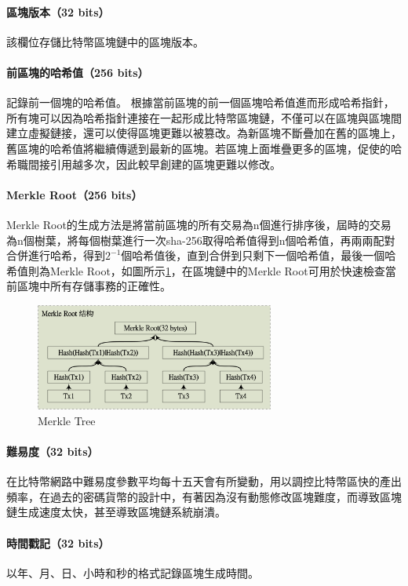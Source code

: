 			\paragraph{區塊版本（32 bits）}該欄位存儲比特幣區塊鏈中的區塊版本。
			\paragraph{前區塊的哈希值（256 bits）}記錄前一個塊的哈希值。 根據當前區塊的前一個區塊哈希值進而形成哈希指針，所有塊可以因為哈希指針連接在一起形成比特幣區塊鏈，不僅可以在區塊與區塊間建立虛擬鏈接，還可以使得區塊更難以被篡改。為新區塊不斷疊加在舊的區塊上，舊區塊的哈希值將繼續傳遞到最新的區塊。若區塊上面堆疊更多的區塊，促使的哈希職間接引用越多次，因此較早創建的區塊更難以修改。
			\paragraph{Merkle Root（256 bits）}Merkle Root的生成方法是將當前區塊的所有交易為n個進行排序後，屆時的交易為n個樹葉，將每個樹葉進行一次sha-256取得哈希值得到n個哈希值，再兩兩配對合併進行哈希，得到$2^{-1}$個哈希值後，直到合併到只剩下一個哈希值，最後一個哈希值則為Merkle Root，如圖所示\ref{MerkleRoot}，在區塊鏈中的Merkle Root可用於快速檢查當前區塊中所有存儲事務的正確性。

			\begin{figure}[h]
				\centering
				\includegraphics[width = 0.7\textwidth]{MerkleRoot.png}
				\caption{Merkle Tree}\label{MerkleRoot}
			\end{figure}

			
			\paragraph{難易度（32 bits）}在比特幣網路中難易度參數平均每十五天會有所變動，用以調控比特幣區快的產出頻率，在過去的密碼貨幣的設計中，有著因為沒有動態修改區塊難度，而導致區塊鏈生成速度太快，甚至導致區塊鏈系統崩潰。
			\paragraph{時間戳記（32 bits）}以年、月、日、小時和秒的格式記錄區塊生成時間。
